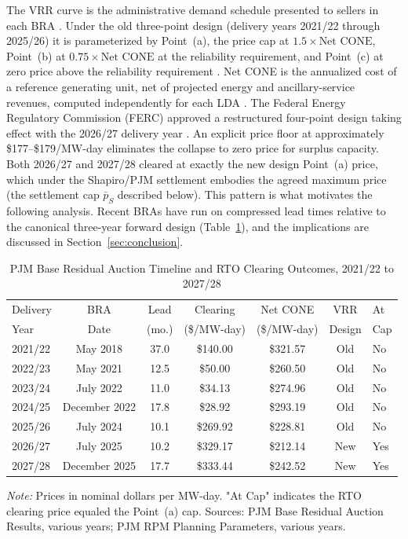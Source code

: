 The VRR curve is the administrative demand schedule presented to
sellers in each BRA \citep{PJM_Manual18}. Under the old three-point
design (delivery years 2021/22 through 2025/26) it is parameterized
by Point~(a), the price cap at $1.5 \times \text{Net CONE}$,
Point~(b) at $0.75 \times \text{Net CONE}$ at the reliability
requirement, and Point~(c) at zero price above the reliability
requirement \citep{Bowring2013_pjm, Pfeifenberger2011_rpm}. Net CONE is the annualized cost of a
reference generating unit, net of projected energy and
ancillary-service revenues, computed independently for each LDA
\citep{PJM_Manual18, PJM_Manual20A}. The Federal Energy Regulatory
Commission (FERC) approved a restructured four-point design taking
effect with the 2026/27 delivery year
\citep{FERC2025_ER25-1357}. An explicit price floor at approximately
\$177--\$179/MW-day eliminates the collapse to zero price for surplus
capacity. Both 2026/27 and 2027/28 cleared at exactly the new design
Point~(a) price, which under the Shapiro/PJM settlement embodies the
agreed maximum price (the settlement cap $\bar p_S$ described below).
This pattern is what motivates the following analysis. Recent BRAs have
run on compressed lead times relative to the canonical three-year
forward design (Table~\ref{tab:bra_timeline}), and the implications
are discussed in Section~\ref{sec:conclusion}.

\begin{table}[H]
  \centering
  \caption{PJM Base Residual Auction Timeline and RTO Clearing Outcomes,
    2021/22 to 2027/28}
  \label{tab:bra_timeline}
  \begin{tabular}{lcccccl}
    \toprule
    Delivery & BRA    & Lead   & Clearing    & Net CONE    & VRR    & At  \\
    Year     & Date   & (mo.)  & (\$/MW-day) & (\$/MW-day) & Design & Cap \\
    \midrule
    2021/22 & May 2018    & 37.0 & \$140.00 & \$321.57 & Old & No \\
    2022/23 & May 2021    & 12.5 & \$50.00  & \$260.50 & Old & No \\
    2023/24 & July 2022   & 11.0 & \$34.13  & \$274.96 & Old & No \\
    2024/25 & December 2022 & 17.8 & \$28.92  & \$293.19 & Old & No \\
    2025/26 & July 2024     & 10.1 & \$269.92 & \$228.81 & Old & No \\
    2026/27 & July 2025     & 10.2 & \$329.17 & \$212.14 & New & Yes \\
    2027/28 & December 2025 & 17.7 & \$333.44 & \$242.52 & New & Yes \\
    \bottomrule
  \end{tabular}
  \vspace{3pt}

  \begin{minipage}{0.92\textwidth}
    \footnotesize \textit{Note:} Prices in nominal dollars per MW-day.
    "At Cap" indicates the RTO clearing price equaled the Point~(a)
    cap. Sources: PJM Base Residual Auction Results, various years;
    PJM RPM Planning Parameters, various years.
  \end{minipage}
\end{table}

